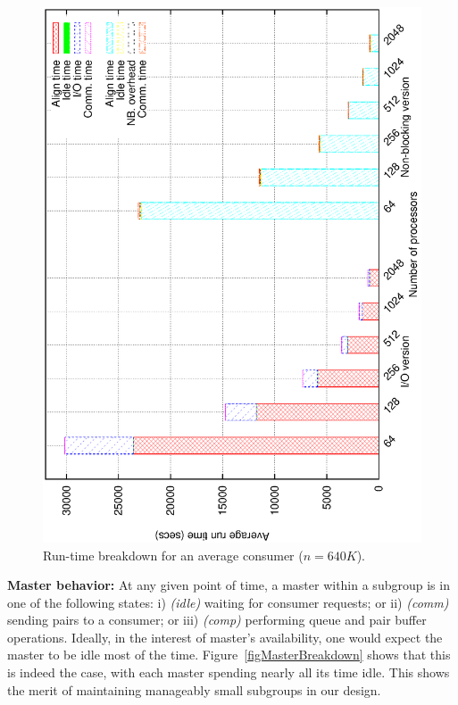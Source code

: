 \documentclass[10pt,journal,letterpaper,compsoc]{IEEEtran}
\begin{document}
\begin{figure}[thb]
\centerline{
						\includegraphics[angle=-90, scale=0.35]{csBreak.eps}
            }
\caption{
Run-time breakdown for an average consumer ($n=640K$).
}
\label{figConsumerBreakdown}
\end{figure}

{\bf Master behavior:} At any given point of time, a master within a subgroup is in one of the following states: i) \emph{(idle)} waiting for consumer requests; or ii) \emph{(comm)} sending pairs to a consumer; or iii) \emph{(comp)} performing queue and pair buffer operations. Ideally, in the interest of master's availability, one would expect the master to be idle most of the time. Figure~\ref{figMasterBreakdown} shows that this is indeed the case, with each master spending nearly all its time idle. This shows the merit of maintaining manageably small subgroups in our design. 
\end{document}
